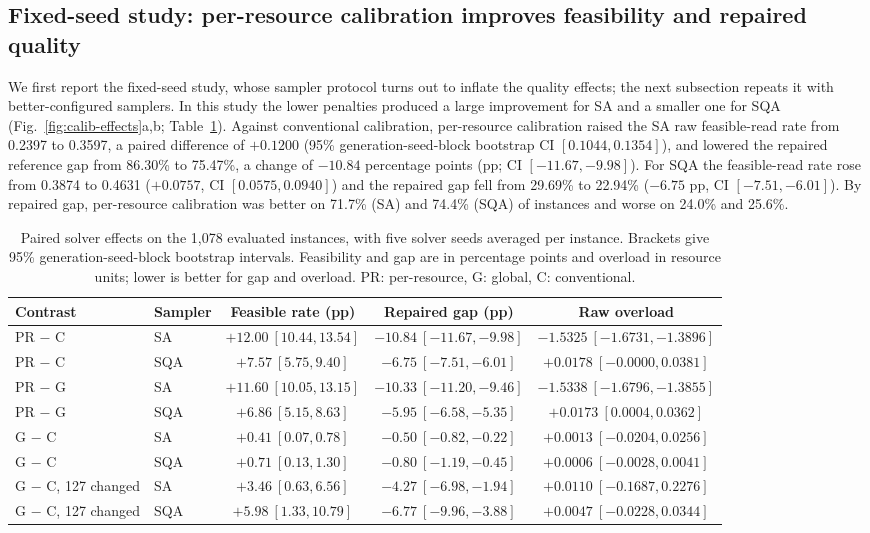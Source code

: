 \documentclass[pdflatex,sn-nature]{sn-jnl}
\theoremstyle{plain}
\theoremstyle{remark}
\begin{document}
\subsection{Fixed-seed study: per-resource calibration improves feasibility and repaired quality}

We first report the fixed-seed study, whose sampler protocol turns out to inflate the quality effects; the next subsection repeats it with better-configured samplers. In this study the lower penalties produced a large improvement for SA and a smaller one for SQA (Fig.~\ref{fig:calib-effects}a,b; Table~\ref{tab:calib-main}). Against conventional calibration, per-resource calibration raised the SA raw feasible-read rate from 0.2397 to 0.3597, a paired difference of $+0.1200$ (95\% generation-seed-block bootstrap CI $[0.1044,0.1354]$), and lowered the repaired reference gap from 86.30\% to 75.47\%, a change of $-10.84$ percentage points (pp; CI $[-11.67,-9.98]$). For SQA the feasible-read rate rose from 0.3874 to 0.4631 ($+0.0757$, CI $[0.0575,0.0940]$) and the repaired gap fell from 29.69\% to 22.94\% ($-6.75$ pp, CI $[-7.51,-6.01]$). By repaired gap, per-resource calibration was better on 71.7\% (SA) and 74.4\% (SQA) of instances and worse on 24.0\% and 25.6\%.

\begin{table}[t]
\caption{Paired solver effects on the 1,078 evaluated instances, with five solver seeds averaged per instance. Brackets give 95\% generation-seed-block bootstrap intervals. Feasibility and gap are in percentage points and overload in resource units; lower is better for gap and overload. PR: per-resource, G: global, C: conventional.}\label{tab:calib-main}
\centering
\footnotesize
\setlength{\tabcolsep}{3pt}
\begin{tabular}{@{}llccc@{}}
\toprule
Contrast & Sampler & Feasible rate (pp) & Repaired gap (pp) & Raw overload\\
\midrule
PR $-$ C & SA & $+12.00\ [10.44,13.54]$ & $-10.84\ [-11.67,-9.98]$ & $-1.5325\ [-1.6731,-1.3896]$\\
PR $-$ C & SQA & $+7.57\ [5.75,9.40]$ & $-6.75\ [-7.51,-6.01]$ & $+0.0178\ [-0.0000,0.0381]$\\
PR $-$ G & SA & $+11.60\ [10.05,13.15]$ & $-10.33\ [-11.20,-9.46]$ & $-1.5338\ [-1.6796,-1.3855]$\\
PR $-$ G & SQA & $+6.86\ [5.15,8.63]$ & $-5.95\ [-6.58,-5.35]$ & $+0.0173\ [0.0004,0.0362]$\\
G $-$ C & SA & $+0.41\ [0.07,0.78]$ & $-0.50\ [-0.82,-0.22]$ & $+0.0013\ [-0.0204,0.0256]$\\
G $-$ C & SQA & $+0.71\ [0.13,1.30]$ & $-0.80\ [-1.19,-0.45]$ & $+0.0006\ [-0.0028,0.0041]$\\
G $-$ C, 127 changed & SA & $+3.46\ [0.63,6.56]$ & $-4.27\ [-6.98,-1.94]$ & $+0.0110\ [-0.1687,0.2276]$\\
G $-$ C, 127 changed & SQA & $+5.98\ [1.33,10.79]$ & $-6.77\ [-9.96,-3.88]$ & $+0.0047\ [-0.0228,0.0344]$\\
\bottomrule
\end{tabular}
\end{table}
\end{document}
